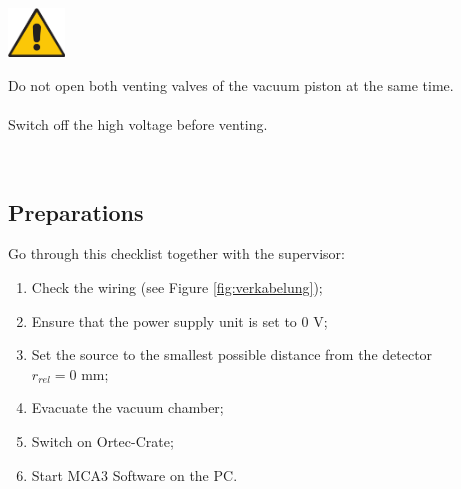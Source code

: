 \begin{minipage}[c]{.15\linewidth}
	\includegraphics[width=1.5cm]{img/attention}
\end{minipage}
\begin{minipage}[t]{.85\linewidth}
	Do not open both venting valves of the vacuum piston at the same time.
	\\ \\
	Switch off the high voltage before venting.
\end{minipage}\vspace{1em}\\ 
%
\clearpage
%
\subsection{Preparations}
Go through this checklist together with the supervisor:
\begin{enumerate}
	\item Check the wiring (see Figure \ref{fig:verkabelung});
	\item Ensure that the power supply unit is set to $0$ V;
	\item Set the source to the smallest possible distance from the detector \\$r_{rel} = 0$ mm;
	\item Evacuate the vacuum chamber;
	\item Switch on Ortec-Crate;
	\item Start MCA3 Software on the PC.
\end{enumerate}
%
